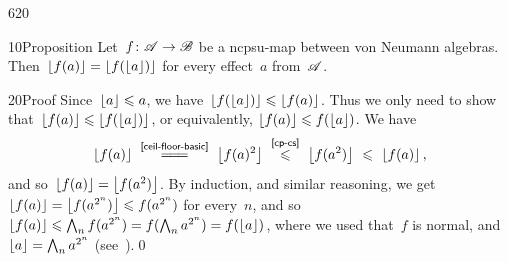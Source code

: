\begin{parsec}{620}%
\begin{point}{10}{Proposition}%
Let~$f\colon \mathscr{A}\to\mathscr{B}$ be a ncpsu-map
between von Neumann algebras.
Then~$\left\lfloor f(a)\right\rfloor=\left\lfloor f(\left\lfloor a\right\rfloor)\right\rfloor$
for every effect~$a$ from~$\mathscr{A}$.
\begin{point}{20}{Proof}%
Since~$\left\lfloor a\right\rfloor\leqslant a$,
we have~$\left\lfloor f(\left\lfloor a\right\rfloor)\right\rfloor\leqslant \left\lfloor f(a)\right\rfloor$.
Thus we only need to show that~$\left\lfloor f(a)\right\rfloor\leqslant \left\lfloor f(\left\lfloor a\right\rfloor)\right\rfloor$,
or equivalently, $\left\lfloor f(a)\right\rfloor\leqslant f(\left\lfloor a\right\rfloor)$.
We have
\begin{equation*}
\floor{f(a)}
\ \overset{\sref{ceil-floor-basic}}{=\joinrel=\joinrel=}\ 
\floor{f(a)^2}
\ \stackrel{\sref{cp-cs}}{\leq}\
\floor{f(a^2)} \ \leq\ \floor{f(a)},
\end{equation*}
and so~$\left\lfloor f(a)\right\rfloor=\left\lfloor f(a^2)\right\rfloor$.
By induction,
and similar reasoning,
we get~$\left\lfloor f(a)\right\rfloor=\left\lfloor f(a^{2^n})\right\rfloor\leqslant f(a^{2^n})$
for every~$n$,
and so
$\left\lfloor f(a)\right\rfloor\leqslant \bigwedge_n f(a^{2^n})
= f(\bigwedge_n a^{2^n})=f(\left\lfloor a\right\rfloor)$,
where we used that~$f$ is normal,
and~$\left\lfloor a\right\rfloor=\bigwedge_n a^{2^n}$ (see~).\qed
\end{point}
\end{point}
\end{parsec}
